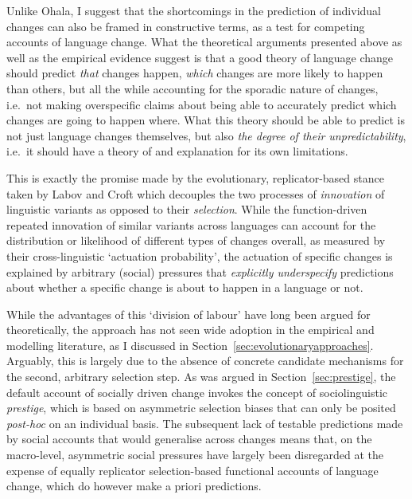 Unlike Ohala, I suggest that the shortcomings in the prediction of individual changes can also be framed in constructive terms, as a test for competing accounts of language change. What the theoretical arguments presented above as well as the empirical evidence suggest is that a good theory of language change should predict \emph{that} changes happen, \emph{which} changes are more likely to happen than others, but all the while accounting for the sporadic nature of changes, i.e.~not making overspecific claims about being able to accurately predict which changes are going to happen where.
What this theory should be able to predict is not just language changes themselves, but also \emph{the degree of their unpredictability}, i.e.~it should have a theory of and explanation for its own limitations.

This is exactly the promise made by the evolutionary, replicator-based stance taken by Labov and Croft which decouples the two processes of \emph{innovation} of linguistic variants as opposed to their \emph{selection}. While the function-driven repeated innovation of similar variants across languages can account for the distribution or likelihood of different types of changes overall, as measured by their cross-linguistic `actuation probability', the actuation of specific changes is explained by arbitrary (social) pressures that \emph{explicitly underspecify} predictions about whether a specific change is about to happen in a language or not.

While the advantages of this `division of labour' have long been argued for theoretically, the approach has not seen wide adoption in the empirical and modelling literature, as I discussed in Section~\ref{sec:evolutionaryapproaches}. Arguably, this is largely due to the absence of concrete candidate mechanisms for the second, arbitrary selection step. As was argued in Section~\ref{sec:prestige}, the default account of socially driven change invokes the concept of sociolinguistic \emph{prestige}, which is based on asymmetric selection biases that can only be posited \emph{post-hoc} on an individual basis.
The subsequent lack of testable predictions made by social accounts that would generalise across changes means that, on the macro-level, asymmetric social pressures have largely been disregarded at the expense of equally replicator selection-based functional accounts of language change, which do however make a priori predictions.

